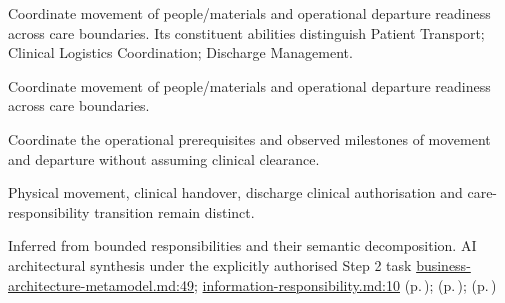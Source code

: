 Coordinate movement of people/\allowbreak{}materials and operational departure readiness across care boundaries. Its constituent abilities distinguish Patient Transport; Clinical Logistics Coordination; Discharge Management.



Coordinate movement of people/\allowbreak{}materials and operational departure readiness across care boundaries.



Coordinate the operational prerequisites and observed milestones of movement and departure without assuming clinical clearance.



Physical movement, clinical handover, discharge clinical authorisation and care-responsibility transition remain distinct.


Inferred from bounded responsibilities and their semantic decomposition. AI architectural synthesis under the explicitly authorised Step 2 task \hyperref[evidence:4bac85accd34ce0b]{business-architecture-metamodel.md:49}; \hyperref[evidence:be61392fefb4bb10]{information-responsibility.md:10}
 (p.\,\pageref{cap:bec-patient-transport});  (p.\,\pageref{cap:bec-clinical-logistics-coordination});  (p.\,\pageref{cap:bec-discharge-management})
